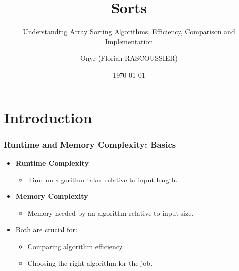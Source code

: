 \documentclass[compress,12pt,bookmark]{beamer}
\title{Sorts}
\subtitle{Understanding Array Sorting Algorithms, Efficiency, Comparison and Implementation}
\date{\today}
\author{Onyr (Florian RASCOUSSIER)}
\institute{INSA Lyon \& IMT Atlantique}
\begin{document}
\frame[plain]{\titlepage}

\section{Introduction}

\begin{frame}
    \frametitle{Runtime and Memory Complexity: Basics}

    \begin{itemize}
          \item \textbf{Runtime Complexity}
                \begin{itemize}
                      \item Time an algorithm takes relative to input length.
                \end{itemize}
          \item \textbf{Memory Complexity}
                \begin{itemize}
                      \item Memory needed by an algorithm relative to input size.
                \end{itemize}
          \item Both are crucial for:
                \begin{itemize}
                      \item Comparing algorithm efficiency.
                      \item Choosing the right algorithm for the job.
                \end{itemize}
    \end{itemize}
\end{frame}
\end{document}
